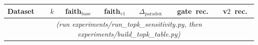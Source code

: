 \begin{tabular}{lcccccc}
\toprule
Dataset & $k$ & faith$_{\textrm{base}}$ & faith$_{\textrm{v1}}$ & $\Delta_{\textrm{paradox}}$ & gate~rec. & v$2$~rec. \\
\midrule
\multicolumn{7}{c}{\emph{(run experiments/run\_topk\_sensitivity.py, then experiments/build\_topk\_table.py)}} \\
\bottomrule
\end{tabular}

